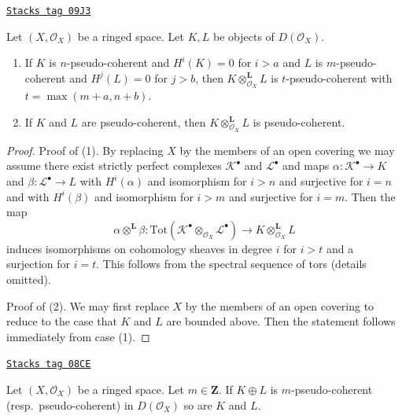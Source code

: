\begin{lemma}
\label{cohomology-lemma-tensor-pseudo-coherent}
\href{https://stacks.math.columbia.edu/tag/09J3}{\texttt{Stacks tag 09J3}}

Let $(X, \mathcal{O}_X)$ be a ringed space. Let $K, L$ be objects
of $D(\mathcal{O}_X)$.
\begin{enumerate}
\item If $K$ is $n$-pseudo-coherent and $H^i(K) = 0$ for $i > a$
and $L$ is $m$-pseudo-coherent and $H^j(L) = 0$ for $j > b$, then
$K \otimes_{\mathcal{O}_X}^\mathbf{L} L$ is $t$-pseudo-coherent
with $t = \max(m + a, n + b)$.
\item If $K$ and $L$ are pseudo-coherent, then
$K \otimes_{\mathcal{O}_X}^\mathbf{L} L$ is pseudo-coherent.
\end{enumerate}
\end{lemma}

\begin{proof}
Proof of (1). By replacing $X$ by the members of an open covering
we may assume there exist strictly perfect complexes $\mathcal{K}^\bullet$
and $\mathcal{L}^\bullet$ and maps
$\alpha : \mathcal{K}^\bullet \to K$ and
$\beta : \mathcal{L}^\bullet \to L$ with $H^i(\alpha)$ and isomorphism
for $i > n$ and surjective for $i = n$ and with
$H^i(\beta)$ and isomorphism for $i > m$ and surjective for $i = m$.
Then the map
$$
\alpha \otimes^\mathbf{L} \beta :
\text{Tot}(\mathcal{K}^\bullet \otimes_{\mathcal{O}_X} \mathcal{L}^\bullet)
\to K \otimes_{\mathcal{O}_X}^\mathbf{L} L
$$
induces isomorphisms on cohomology sheaves in degree $i$ for
$i > t$ and a surjection for $i = t$. This follows from the
spectral sequence of tors (details omitted).

\medskip\noindent
Proof of (2). We may first replace $X$ by the members of an open
covering to reduce to the case that $K$ and $L$ are bounded above.
Then the statement follows immediately from case (1).
\end{proof}

\begin{lemma}
\label{cohomology-lemma-summands-pseudo-coherent}
\href{https://stacks.math.columbia.edu/tag/08CE}{\texttt{Stacks tag 08CE}}

Let $(X, \mathcal{O}_X)$ be a ringed space. Let $m \in \mathbf{Z}$.
If $K \oplus L$ is $m$-pseudo-coherent (resp.\ pseudo-coherent)
in $D(\mathcal{O}_X)$ so are $K$ and $L$.
\end{lemma}

